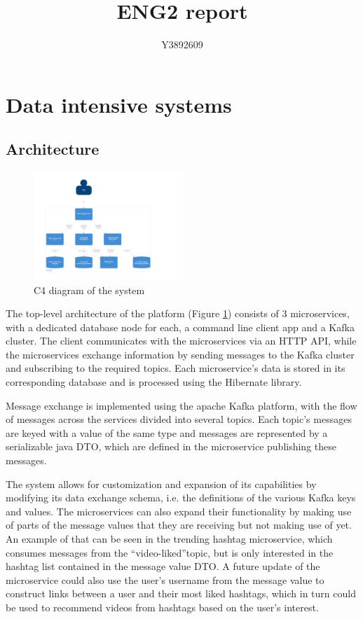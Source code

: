 \documentclass[parskip=full]{article}
\begin{document}
    \title{ENG2 report}
    \author{Y3892609}
    \date{}
    \maketitle
    \tableofcontents
    \pagebreak
    \section{Data intensive systems}
    \subsection{Architecture}
    \begin{figure}
        \includegraphics[width=0.5\textwidth]{c4-diagram-top-level}
        \caption{C4 diagram of the system}
        \label{fig:c4Diagram}
    \end{figure}

    The top-level architecture of the platform (Figure \ref{fig:c4Diagram}) consists of 3 microservices, with a dedicated database node for each, a command line client app and a Kafka cluster.
    The client communicates with the microservices via an HTTP API, while the microservices exchange information by sending messages to the Kafka cluster and subscribing to the required topics.
    Each microservice's data is stored in its corresponding database and is processed using the Hibernate library.

    Message exchange is implemented using the apache Kafka platform, with the flow of messages across the services divided into several topics.
    Each topic's messages are keyed with a value of the same type and messages are represented by a serializable java DTO, which are defined in the microservice publishing these messages.

    The system allows for customization and expansion of its capabilities by modifying its data exchange schema, i.e. the definitions of the various Kafka keys and values.
    The microservices can also expand their functionality by making use of parts of the message values that they are receiving but not making use of yet.
    An example of that can be seen in the trending hashtag microservice, which consumes messages from the ``video-liked''topic, but is only interested in the hashtag list contained in the message value DTO. A future update of the microservice could also use the user's username from the message value to construct links between a user and their most liked hashtags, which in turn could be used to recommend videos from hashtags based on the user's interest.
\end{document}
